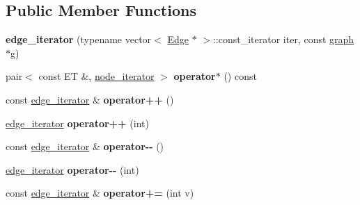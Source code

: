 \subsection*{Public Member Functions}
\begin{DoxyCompactItemize}
\item 
\hypertarget{classgraph_1_1edge__iterator_a9f8774d21a021347e94238bde191464b}{{\bfseries edge\+\_\+iterator} (typename vector$<$ \hyperlink{structgraph_1_1Edge}{Edge} $\ast$ $>$\+::const\+\_\+iterator iter, const \hyperlink{classgraph}{graph} $\ast$g)}\label{classgraph_1_1edge__iterator_a9f8774d21a021347e94238bde191464b}

\item 
\hypertarget{classgraph_1_1edge__iterator_ac36e53fb781544acaa92112ad71c59d5}{pair$<$ const E\+T \&, \hyperlink{classgraph_1_1node__iterator}{node\+\_\+iterator} $>$ {\bfseries operator$\ast$} () const }\label{classgraph_1_1edge__iterator_ac36e53fb781544acaa92112ad71c59d5}

\item 
\hypertarget{classgraph_1_1edge__iterator_ab8e3c8768c990af31d9fbb0de7e6e61f}{const \hyperlink{classgraph_1_1edge__iterator}{edge\+\_\+iterator} \& {\bfseries operator++} ()}\label{classgraph_1_1edge__iterator_ab8e3c8768c990af31d9fbb0de7e6e61f}

\item 
\hypertarget{classgraph_1_1edge__iterator_a1b23686e252d3c458daa9ef212681d19}{\hyperlink{classgraph_1_1edge__iterator}{edge\+\_\+iterator} {\bfseries operator++} (int)}\label{classgraph_1_1edge__iterator_a1b23686e252d3c458daa9ef212681d19}

\item 
\hypertarget{classgraph_1_1edge__iterator_accb7545e2bc008e9a3e78c6b82a0274c}{const \hyperlink{classgraph_1_1edge__iterator}{edge\+\_\+iterator} \& {\bfseries operator-\/-\/} ()}\label{classgraph_1_1edge__iterator_accb7545e2bc008e9a3e78c6b82a0274c}

\item 
\hypertarget{classgraph_1_1edge__iterator_af8d50792e43cd93274ddc5866fe941d7}{\hyperlink{classgraph_1_1edge__iterator}{edge\+\_\+iterator} {\bfseries operator-\/-\/} (int)}\label{classgraph_1_1edge__iterator_af8d50792e43cd93274ddc5866fe941d7}

\item 
\hypertarget{classgraph_1_1edge__iterator_a5fab360b45d461a96a1d33d4537bd0fd}{const \hyperlink{classgraph_1_1edge__iterator}{edge\+\_\+iterator} \& {\bfseries operator+=} (int v)}\label{classgraph_1_1edge__iterator_a5fab360b45d461a96a1d33d4537bd0fd}


\end{DoxyCompactItemize}
